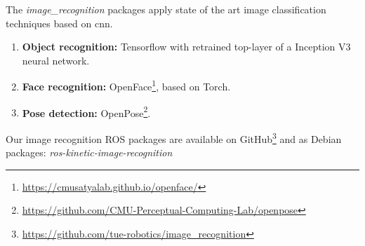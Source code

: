 The \emph{image\_recognition} packages apply state of the art image classification techniques based on \acrfull{cnn}.


\begin{enumerate}
\item \textbf{Object recognition:} Tensorflow\texttrademark\hspace{0em} with retrained top-layer of a Inception V3 neural network.

\item \textbf{Face recognition:} OpenFace\footnote{\url{https://cmusatyalab.github.io/openface/}}, based on Torch.

\item \textbf{Pose detection:} OpenPose\footnote{\url{https://github.com/CMU-Perceptual-Computing-Lab/openpose}}.
\end{enumerate}
Our image recognition ROS packages are available on GitHub\footnote{\url{https://github.com/tue-robotics/image_recognition}} and as Debian packages: \emph{ros-kinetic-image-recognition}
